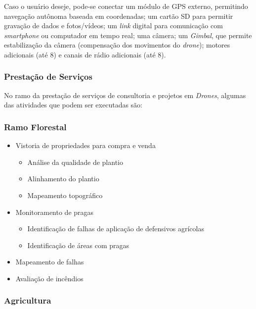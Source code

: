 Caso o usuário deseje, pode-se conectar um módulo de GPS externo, 
permitindo navegação autônoma baseada em coordenadas; um cartão
SD para permitir gravação de dados e fotos/vídeos; um \emph{link}
digital para comunicação com \emph{smartphone} ou computador em 
tempo real; uma câmera; um \emph{Gimbal}, que permite estabilização 
da câmera (compensação dos movimentos do \emph{drone}); motores 
adicionais (até 8) e canais de rádio adicionais (até 8).

\subsubsection*{Prestação de Serviços}

No ramo da prestação de serviços de consultoria e projetos em \emph{
Drones}, algumas das atividades que podem ser executadas são:

\subsubsection*{Ramo Florestal}

\begin{itemize}
	\item Vistoria de propriedades para compra e venda
	\begin{itemize}
		\item Análise da qualidade de plantio
		\item Alinhamento do plantio
		\item Mapeamento topográfico
	\end{itemize}
	\item Monitoramento de pragas
	\begin{itemize}
		\item Identificação de falhas de aplicação de defensivos agrícolas
		\item Identificação de áreas com pragas
	\end{itemize}
	\item Mapeamento de falhas
	\item Avaliação de incêndios
\end{itemize}

\subsubsection*{Agricultura}

